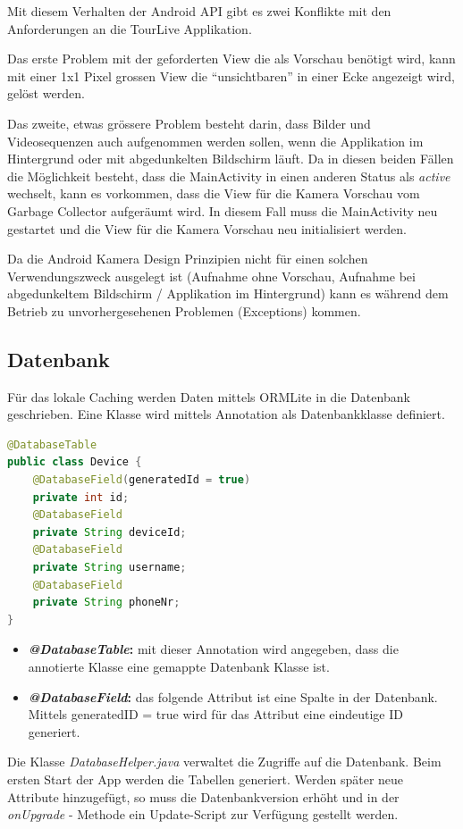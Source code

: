 Mit diesem Verhalten der Android API gibt es zwei Konflikte mit den Anforderungen an die TourLive Applikation. 

Das erste Problem mit der geforderten View die als Vorschau benötigt wird,  kann mit einer 1x1 Pixel grossen View die ``unsichtbaren'' in einer Ecke angezeigt wird, gelöst werden. 

Das zweite, etwas grössere Problem besteht darin, dass Bilder und Videosequenzen auch aufgenommen werden sollen, wenn die Applikation im Hintergrund oder mit abgedunkelten Bildschirm läuft. Da in diesen beiden Fällen die Möglichkeit besteht, dass die MainActivity in einen anderen Status als \textit{active} wechselt, kann es vorkommen, dass die View für die Kamera Vorschau vom Garbage Collector aufgeräumt wird. In diesem Fall muss die MainActivity neu gestartet und die View für die Kamera Vorschau neu initialisiert werden. 

Da die Android Kamera Design Prinzipien nicht für einen solchen Verwendungszweck ausgelegt ist (Aufnahme ohne Vorschau, Aufnahme bei abgedunkeltem Bildschirm / Applikation im Hintergrund) kann es während dem Betrieb zu unvorhergesehenen Problemen (Exceptions) kommen.

\subsection{Datenbank}
Für das lokale Caching werden Daten mittels ORMLite in die Datenbank geschrieben. Eine Klasse wird mittels Annotation als Datenbankklasse definiert.

\begin{lstlisting}[language=Java, caption=ORMLite Annotations]
@DatabaseTable
public class Device {
	@DatabaseField(generatedId = true)
	private int id;
	@DatabaseField
	private String deviceId;
	@DatabaseField
	private String username;
	@DatabaseField
	private String phoneNr;
}
\end{lstlisting}

\begin{itemize}
\item \textbf{\textit{@DatabaseTable}:} mit dieser Annotation wird angegeben, dass die annotierte Klasse  eine gemappte Datenbank Klasse ist.
\item \textbf{\textit{@DatabaseField}:} das folgende Attribut ist eine Spalte in der Datenbank. Mittels generatedID = true wird für das Attribut eine eindeutige ID generiert.
\end{itemize}


Die Klasse \textit{DatabaseHelper.java} verwaltet die Zugriffe auf die Datenbank. Beim ersten Start der App werden die Tabellen generiert. Werden später neue Attribute hinzugefügt, so muss die Datenbankversion erhöht und in der \textit{onUpgrade} - Methode ein Update-Script zur Verfügung gestellt werden.\\

